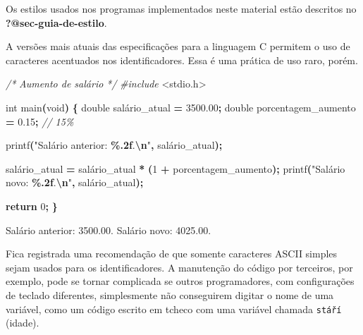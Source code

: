 \documentclass[
  11pt,
  a4paper,
]{scrbook}
\newenvironment{Shaded}{\begin{snugshade}}{\end{snugshade}}
\newcommand{\CommentTok}[1]{\textcolor[rgb]{0.56,0.35,0.01}{\textit{#1}}}
\newcommand{\ControlFlowTok}[1]{\textcolor[rgb]{0.13,0.29,0.53}{\textbf{#1}}}
\newcommand{\DataTypeTok}[1]{\textcolor[rgb]{0.13,0.29,0.53}{#1}}
\newcommand{\DecValTok}[1]{\textcolor[rgb]{0.00,0.00,0.81}{#1}}
\newcommand{\FloatTok}[1]{\textcolor[rgb]{0.00,0.00,0.81}{#1}}
\newcommand{\ImportTok}[1]{#1}
\newcommand{\NormalTok}[1]{#1}
\newcommand{\OperatorTok}[1]{\textcolor[rgb]{0.81,0.36,0.00}{\textbf{#1}}}
\newcommand{\PreprocessorTok}[1]{\textcolor[rgb]{0.56,0.35,0.01}{\textit{#1}}}
\newcommand{\SpecialCharTok}[1]{\textcolor[rgb]{0.81,0.36,0.00}{\textbf{#1}}}
\newcommand{\StringTok}[1]{\textcolor[rgb]{0.31,0.60,0.02}{#1}}
\begin{document}
Os estilos usados nos programas implementados neste material estão
descritos no \textbf{?@sec-guia-de-estilo}.

\begin{tcolorbox}[enhanced jigsaw, arc=.35mm, bottomtitle=1mm, colbacktitle=quarto-callout-tip-color!10!white, title=\textcolor{quarto-callout-tip-color}{\faLightbulb}\hspace{0.5em}{Dica}, toprule=.15mm, left=2mm, opacityback=0, colback=white, colframe=quarto-callout-tip-color-frame, opacitybacktitle=0.6, bottomrule=.15mm, leftrule=.75mm, toptitle=1mm, coltitle=black, titlerule=0mm, rightrule=.15mm, breakable]

A versões mais atuais das especificações para a linguagem C permitem o
uso de caracteres acentuados nos identificadores. Essa é uma prática de
uso raro, porém.

\begin{Shaded}
\begin{Highlighting}[]
\CommentTok{/*}
\CommentTok{Aumento de salário}
\CommentTok{*/}
\PreprocessorTok{\#include }\ImportTok{\textless{}stdio.h\textgreater{}}

\DataTypeTok{int}\NormalTok{ main}\OperatorTok{(}\DataTypeTok{void}\OperatorTok{)} \OperatorTok{\{}
    \DataTypeTok{double}\NormalTok{ salário\_atual }\OperatorTok{=} \FloatTok{3500.00}\OperatorTok{;}
    \DataTypeTok{double}\NormalTok{ porcentagem\_aumento }\OperatorTok{=} \FloatTok{0.15}\OperatorTok{;}  \CommentTok{// 15\%}

\NormalTok{    printf}\OperatorTok{(}\StringTok{"Salário anterior: }\SpecialCharTok{\%.2f}\StringTok{.}\SpecialCharTok{\textbackslash{}n}\StringTok{"}\OperatorTok{,}\NormalTok{ salário\_atual}\OperatorTok{);}

\NormalTok{    salário\_atual }\OperatorTok{=}\NormalTok{ salário\_atual }\OperatorTok{*} \OperatorTok{(}\DecValTok{1} \OperatorTok{+}\NormalTok{ porcentagem\_aumento}\OperatorTok{);}
\NormalTok{    printf}\OperatorTok{(}\StringTok{"Salário novo: }\SpecialCharTok{\%.2f}\StringTok{.}\SpecialCharTok{\textbackslash{}n}\StringTok{"}\OperatorTok{,}\NormalTok{ salário\_atual}\OperatorTok{);}

    \ControlFlowTok{return} \DecValTok{0}\OperatorTok{;}
\OperatorTok{\}}
\end{Highlighting}
\end{Shaded}

\begin{Shaded}
\begin{Highlighting}[]
\NormalTok{Salário anterior: 3500.00.}
\NormalTok{Salário novo: 4025.00.}
\end{Highlighting}
\end{Shaded}

Fica registrada uma recomendação de que somente caracteres ASCII simples
sejam usados para os identificadores. A manutenção do código por
terceiros, por exemplo, pode se tornar complicada se outros
programadores, com configurações de teclado diferentes, simplesmente não
conseguirem digitar o nome de uma variável, como um código escrito em
tcheco com uma variável chamada \texttt{stáří} (idade).

\end{tcolorbox}
\end{document}
